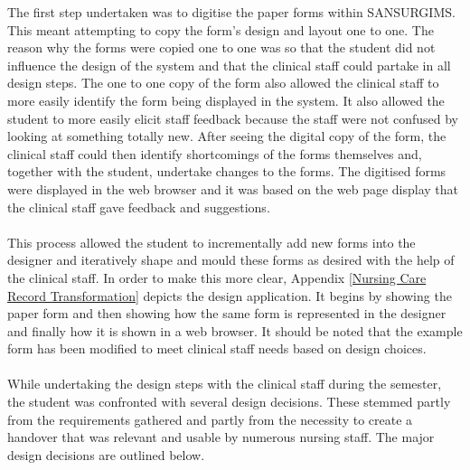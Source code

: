 \noindent The first step undertaken was to digitise the paper forms within SANSURGIMS. This meant attempting to copy the form's design and layout one to one. The reason why the forms were copied one to one was so that the student did not influence the design of the system and that the clinical staff could partake in all design steps. The one to one copy of the form also allowed the clinical staff to more easily identify the form being displayed in the system. It also allowed the student to more easily elicit staff feedback because the staff were not confused by looking at something totally new. After seeing the digital copy of the form, the clinical staff could then identify shortcomings of the forms themselves and, together with the student, undertake changes to the forms. The digitised forms were displayed in the web browser and it was based on the web page display that the clinical staff gave feedback and suggestions. 
\\ \\
This process allowed the student to incrementally add new forms into the designer and iteratively shape and mould these forms as desired with the help of the clinical staff. In order to make this more clear, Appendix \ref{Nursing Care Record Transformation} depicts the design application. It begins by showing the paper form and then showing how the same form is represented in the designer and finally how it is shown in a web browser. It should be noted that the example form has been modified to meet clinical staff needs based on design choices.
\\ \\ 
While undertaking the design steps with the clinical staff during the semester, the student was confronted with several design decisions. These stemmed partly from the requirements gathered and partly from the necessity to create a handover that was relevant and usable by numerous nursing staff. The major design decisions are outlined below.

